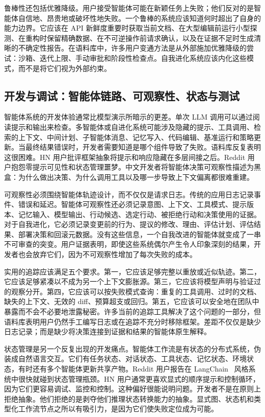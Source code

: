 鲁棒性还包括优雅降级。用户接受智能体可能在新颖任务上失败；他们反对的是智能体自信地、昂贵地或破坏性地失败。一个鲁棒的系统应该知道何时超出了自身的能力边界。它应该在 API 新鲜度重要时获取当前文档、在大型编辑前运行小型探测、在重构时保留精确数据、在不可逆操作前请求确认，以及在证据不足时生成清晰的不确定性报告。在语料库中，许多用户变通方法是从外部施加优雅降级的尝试：沙箱、迭代上限、手动审批和阶段性检查点。自我进化系统应该内化这些模式，而不是将它们视为外部约束。

\subsection{开发与调试：智能体链路、可观察性、状态与测试}
\label{subsec:development-debugging}

智能体系统的开发体验通常比模型演示所暗示的更差。单次 LLM 调用可以通过阅读提示和输出来检查。多智能体或自进化系统可能涉及隐藏的提示、工具调用、检索的上下文、中间计划、子智能体消息、记忆写入、代码编辑、基准运行和策略更新。当最终结果错误时，开发者需要知道是哪个组件导致了失败。语料库反复表明这很困难。HN 用户批评框架抽象将提示和响应隐藏在多层间接之后。Reddit 用户抱怨零提示可见性和状态管理噩梦。中文开发者将智能体决策可观察性描述为黑盒：为什么做出决策、为什么调用工具以及哪一步导致上下文偏离都很难重建。

可观察性必须围绕智能体轨迹设计，而不仅仅是请求日志。传统的应用日志记录事件、错误和延迟。智能体可观察性还必须记录意图、上下文、工具模式、提示版本、记忆输入、模型输出、行动候选、选定行动、被拒绝行动和决策使用的证据。对于自我进化，它必须记录变更前的行为、提议的修改、理由、评估计划、评估结果、部署决策和回滚元数据。没有这些信息，一个自我改进的智能体就变成了一串不可审查的突变。用户证据表明，即使这些系统偶尔产生令人印象深刻的结果，开发者也会放弃它们，因为不可观察性增加了每次失败的成本。

实用的追踪应该满足五个要求。第一，它应该足够完整以重放或近似轨迹。第二，它应该足够紧凑以不成为另一个上下文膨胀源。第三，它应该将模型声明与验证过的观察分开。第四，它应该可以按失败模式查询：重复的工具调用、过时的文档、缺失的上下文、无效的 diff、预算超支或回归。第五，它应该可以安全地在团队中暴露而不会不必要地泄露秘密。许多当前的追踪工具解决了这个问题的一部分，但语料库表明用户仍然手工编写日志或在追踪不充分时移除框架。差距不仅仅是缺少日志记录；而是缺少将决策连接到证据和结果的智能体原生解释。

状态管理是另一个反复出现的开发痛点。智能体工作流是有状态的分布式系统，伪装成自然语言交互。它们有任务状态、对话状态、工具状态、记忆状态、环境状态，有时还有多个智能体更新共享产物。Reddit 用户报告在 LangChain~\cite{chase2023langchain} 风格系统中很快就碰到状态管理瓶颈。HN 用户通常更喜欢显式的顺序提示和控制循环，因为它们更容易调试、监控和控制。这种偏好很能说明问题。开发者不是在原则上拒绝抽象。他们拒绝的是剥夺他们推理状态转换能力的抽象。显式图、状态机和类型化工作流节点之所以有吸引力，是因为它们使失败定位成为可能。

